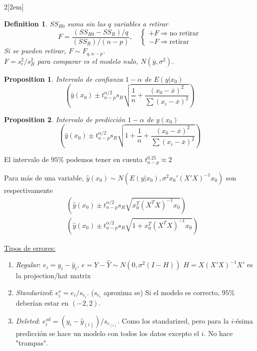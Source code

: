 \documentclass[leqno]{article}
\newtheorem*{proposition}{Proposition}
\newtheorem*{definition}{Definition}
\begin{document}
\begin{multicols}{2}[\columnsep2em]
\begin{definition} $SS_{R0}$ suma sin las $q$ variables a retirar
\[
F = \frac{ (SS_{R0}-SS_R) / q}{ (SS_R) / (n-p)}, \quad \begin{cases}
  + F \Rightarrow \text{no retirar} \\
  -F \Rightarrow \text{retirar}
\end{cases}
\]
Si se pueden retirar, $F \sim F_{q, n-p}$. \\ $F = s^2_e/s^2_R$ para comparar vs el modelo nulo, $N(\overline{y}, \sigma^2)$.
\end{definition}


\begin{proposition} Intervalo de confianza $1-\alpha $ de $E(y|x_0)$
  \[
       \left(\hat{y}(x_0)\pm t_{n-p}^{\alpha / 2} s_R\sqrt{\frac{1}{n}+ \frac{(x_0-\overline{x})^2}{\sum (x_i-\overline{x})^2}} \right)
  \] 
\end{proposition}

\begin{proposition} Intervalo de predicción $1-\alpha $ de $y(x_0)$
  \[
       \left(\hat{y}(x_0)\pm t_{n-p}^{\alpha / 2} s_R\sqrt{1+\frac{1}{n}+ \frac{(x_0-\overline{x})^2}{\sum (x_i-\overline{x})^2}} \right)
  \] 
\end{proposition}
El intervalo de $95\%$ podemos tener en cuenta  $t^{0.25}_{n-p}\approx 2$

Para más de una variable, $\hat y (x_0) \sim N(E(y|x_0), \sigma^2 x_0'(X'X)^{-1}x_0)$ son respectivamente
\begin{align*}
       &\left(\hat{y}(x_0)\pm t_{n-p}^{\alpha / 2} s_R \sqrt{x_0^T(X^TX)^{-1}x_0}  \right) \\
       &\left(\hat{y}(x_0)\pm t_{n-p}^{\alpha / 2} s_R \sqrt{1+ x_0^T(X^TX)^{-1}x_0}  \right)
\end{align*} 

\underline{Tipos de errores:}
\begin{enumerate}
    \item \textit{Regular}: $e_i = y_i-\hat y_i$, $e = Y- \hat Y \sim N(0, \sigma^2(I-H))$ $H = X(X'X)^{-1}X'$ es la projection/hat matrix
    \item \textit{Standarized}: $e_i^s = e_i / s_{e_i}$. ($s_{e_i}$ aproxima se) Si el modelo es correcto, $95\%$ deberían estar en $(-2, 2)$.
    \item \textit{Deleted}: $e_i^{sd} = (y_i - \hat y_{(i)}) / s_{e_{(i)}}$. Como los standarized, pero para la $i$-ésima predicción se hace un modelo con todos los datos excepto el $i$. No hace "trampas".
\end{enumerate}


\end{multicols}
\end{document}
